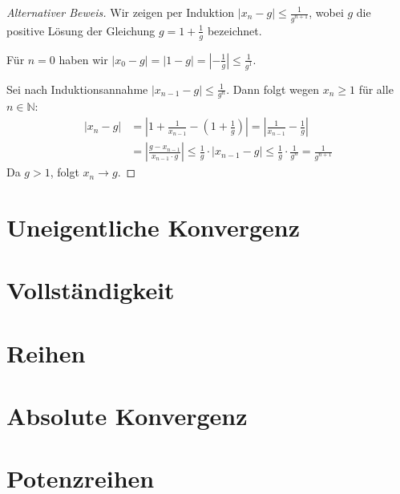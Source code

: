 \begin{proof}[Alternativer Beweis]
Wir zeigen per Induktion $|x_n - g| \leq \frac{1}{g^{n+1}}$, wobei $g$ die positive Lösung der Gleichung
$g = 1 + \frac 1 g $ bezeichnet.

Für $n = 0$ haben wir $|x_0 - g| = | 1 - g | = \left| - \frac 1 g \right| \leq \frac{1}{g^1}$.

Sei nach Induktionsannahme $|x_{n-1} - g | \leq \frac{1}{g^n}$. Dann folgt wegen
$x_n \geq 1$ für alle $n \in \mathbb N$:
\begin{align*}
| x_n - g | 
	&= \left| 1 + \frac{1}{x_{n-1}} - \left( 1 + \frac 1 g \right) \right|
	= \left| \frac{1}{x_{n-1}} - \frac 1 g \right| \\
	&= \left| \frac{g - x_{n-1}}{x_{n-1} \cdot g} \right|
	\leq \frac 1 g \cdot | x_{n-1} - g|
	\leq \frac 1 g \cdot \frac{1}{g^n} = \frac{1}{g^{n+1}}
\end{align*}
Da $g > 1$, folgt $x_n \to g$.
\end{proof}



\section{Uneigentliche Konvergenz}
\section{Vollständigkeit}
\section{Reihen}
\section{Absolute Konvergenz}
\section{Potenzreihen}

